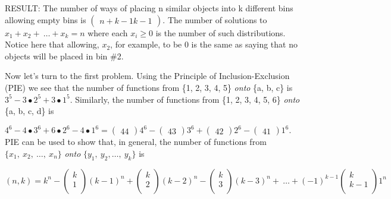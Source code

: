 \documentclass[10pt,letter]{article}
\begin{document}
RESULT: The number of ways of placing n similar objects into k different
bins allowing empty bins is \(\begin{pmatrix}
n + k - 1
k - 1
\end{pmatrix}
\). The number of solutions to
\(x_{1} + x_{2} + \ \ldots + x_{k} = n\) where each \(x_{i} \geq 0\) is
the number of such distributions. Notice here that allowing, \(x_{2}\),
for example, to be 0 is the same as saying that no objects will be
placed in bin \#2.

Now let's turn to the first problem. Using the Principle of
Inclusion-Exclusion (PIE) we see that the number of functions from \{1,
2, 3, 4, 5\} \emph{onto} \{a, b, c\} is
\(3^{5} - 3 \bullet 2^{5} + 3 \bullet 1^{5}\). Similarly, the number of
functions from \{1, 2, 3, 4, 5, 6\} \emph{onto} \{a, b, c, d\} is

\(4^{6} - 4 \bullet 3^{6} + 6 \bullet 2^{6} - 4 \bullet 1^{6} =
\begin{pmatrix}
4
4
\end{pmatrix}
4^{6} -
\begin{pmatrix}
4
3
\end{pmatrix}
3^{6} +
\begin{pmatrix}
4
2
\end{pmatrix}
2^{6} -
\begin{pmatrix}
4
1
\end{pmatrix}
1^{6}.\) PIE can be used to show that, in general, the
number of functions from \(\{ x_{1},\ x_{2},\ \ldots,\ x_{n}\}\)
\emph{onto} \(\{ y_{1},\ y_{2},\ldots,\ y_{k}\}\) is

\[
\left( n,k \right) = k^{n} - \begin{pmatrix}
k \\
1 \\
\end{pmatrix}\left( k - 1 \right)^{n} + \begin{pmatrix}
k \\
2 \\
\end{pmatrix}\left( k - 2 \right)^{n} - \begin{pmatrix}
k \\
3 \\
\end{pmatrix}\left( k - 3 \right)^{n} + \ \ldots + \left( - 1 \right)^{k - 1}\begin{pmatrix}
k \\
k - 1 \\
\end{pmatrix}1^{n}
\]
\end{document}
